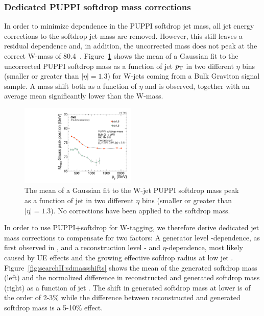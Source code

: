 \subsubsection{Dedicated PUPPI softdrop mass corrections}
\label{sec:searchII:masscorr}
In order to minimize \PT dependence in the PUPPI softdrop jet mass, all jet energy corrections to the softdrop jet mass are removed. However, this still leaves a residual \PT dependence and, in addition, the uncorrected mass does not peak at the correct W-mass of 80.4~\GeV. Figure~\ref{fig:searchII:UncorrSD} shows the mean of a Gaussian fit to the uncorrected PUPPI softdrop mass as a function of jet $p_{\mathrm{T}}$ in two different $\eta$ bins (smaller or greater than $|\eta|=1.3$) for W-jets coming from a Bulk Graviton signal sample. A mass shift both as a function of $\eta$ and \PT is observed, together with an average mean significantly lower than the W-mass.
\begin{figure}[htbp]
\centering
\includegraphics[width=0.49\textwidth]{figures/analysis/search2/AN-16-235/plots/RecoPuppiSoftdropMass_vspt.pdf}
\caption{The mean of a Gaussian fit to the W-jet PUPPI softdrop mass peak as a function of jet \PT in two different $\eta$ bins (smaller or greater than $|\eta|=1.3$). No corrections have been applied to the softdrop mass.}
\label{fig:searchII:UncorrSD}
\end{figure}
In order to use PUPPI+softdrop for W-tagging, we therefore derive dedicated jet mass corrections to compensate for two factors: A generator level \PT-dependence, as first observed in \label{sec:searchI:wtagging}, and a reconstruction level \PT- and $\eta$-dependence, most likely caused by UE effects and the growing effective sofdrop radius at low jet \PT. Figure~\ref{fig:searchII:sdmassshifts} shows the mean of the generated softdrop mass (left) and the normalized difference in reconstructed and generated softdrop mass (right) as a function of jet \PT. The shift in generated softdrop mass at lower \PT is of the order of 2-3$\%$ while the difference between reconstructed and generated softdrop mass is a 5-10$\%$ effect.
